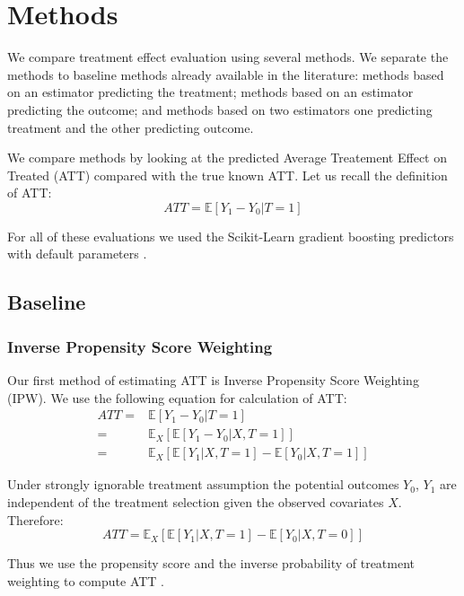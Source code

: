 \documentclass{article}
\begin{document}
\section{Methods}
We compare treatment effect evaluation using several methods. We separate the methods to baseline methods already available in the literature: methods based on an estimator predicting the treatment; methods based on an estimator predicting the outcome; and methods based on two estimators one predicting treatment and the other predicting outcome.

We compare methods by looking at the predicted Average Treatement Effect on Treated (ATT) compared with the true known ATT. Let us recall the definition of ATT:
\begin{equation*}
    ATT = \mathbb{E}[Y_1 - Y_0 | T=1]
\end{equation*}

For all of these evaluations we used the Scikit-Learn gradient boosting predictors with default parameters \cite{scikit-learn}. 

\subsection{Baseline}
\subsubsection{Inverse Propensity Score Weighting}
Our first method of estimating ATT is Inverse Propensity Score Weighting (IPW).
We use the following equation for calculation of ATT:
\begin{equation*}
    \begin{split}
        ATT = & \mathbb{E}[Y_1 - Y_0 | T=1] \\
        = & \mathbb{E}_X[\mathbb{E}[Y_1 - Y_0 | X, T=1]] \\
        = & \mathbb{E}_X[\mathbb{E}[Y_1 | X, T=1] - \mathbb{E}[Y_0 | X, T=1]]
    \end{split}
\end{equation*}

Under strongly ignorable treatment assumption the potential outcomes $Y_0$, $Y_1$ are independent of the treatment selection given the observed covariates $X$. Therefore:
\begin{equation*}
    ATT = \mathbb{E}_X[\mathbb{E}[Y_1|X, T=1] - \mathbb{E}[Y_0 | X, T=0]]
\end{equation*}

Thus we use the propensity score and the inverse probability of treatment weighting to compute ATT \cite{abdia2017propensity}. 
\end{document}
